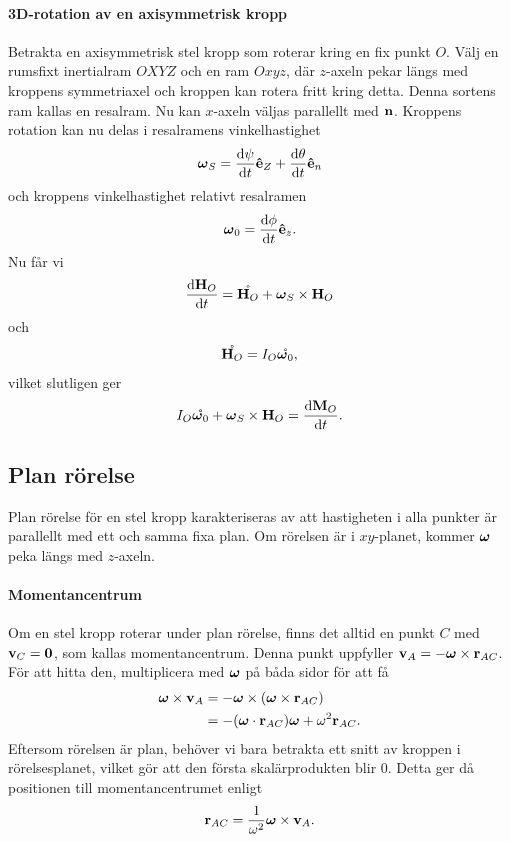 \paragraph{3D-rotation av en axisymmetrisk kropp}
Betrakta en axisymmetrisk stel kropp som roterar kring en fix punkt $O$. Välj en rumsfixt inertialram $OXYZ$ och en ram $Oxyz$, där $z$-axeln pekar längs med kroppens symmetriaxel och kroppen kan rotera fritt kring detta. Denna sortens ram kallas en resalram. Nu kan $x$-axeln väljas parallellt med $\vb{n}$. Kroppens rotation kan nu delas i resalramens vinkelhastighet
\begin{align*}
	\vb*{\omega}_{S} = \dv{\psi}{t}\vu{e}_{Z} + \dv{\theta}{t}\vu{e}_{n}
\end{align*}
och kroppens vinkelhastighet relativt resalramen
\begin{align*}
	\vb*{\omega}_{0} = \dv{\phi}{t}\vu{e}_{z}.
\end{align*}
Nu får vi
\begin{align*}
	\dv{\vb{H}_{O}}{t} = \mathring{\vb{H}_{O}} + \vb*{\omega}_{S}\times\vb{H}_{O}
\end{align*}
och
\begin{align*}
	\mathring{\vb{H}_{O}} = I_{O}\mathring{\vb*{\omega}_{0}},
\end{align*}
vilket slutligen ger
\begin{align*}
	I_{O}\mathring{\vb*{\omega}_{0}} + \vb*{\omega}_{S}\times\vb{H}_{O} = \dv{\vb{M}_{O}}{t}.
\end{align*}

\subsection{Plan rörelse}
Plan rörelse för en stel kropp karakteriseras av att hastigheten i alla punkter är parallellt med ett och samma fixa plan. Om rörelsen är i $xy$-planet, kommer $\vb*{\omega}$ peka längs med $z$-axeln.

\paragraph{Momentancentrum}
Om en stel kropp roterar under plan rörelse, finns det alltid en punkt $C$ med $\vb{v}_{C} = \vb{0}$, som kallas momentancentrum. Denna punkt uppfyller $\vb{v}_{A} = -\vb*{\omega}\times\vb{r}_{AC}$. För att hitta den, multiplicera med $\vb*{\omega}$ på båda sidor för att få
\begin{align*}
	\vb*{\omega}\times\vb{v}_{A} &= -\vb*{\omega}\times(\vb*{\omega}\times\vb{r}_{AC}) \\
	                             &= -(\vb*{\omega}\cdot\vb{r}_{AC})\vb*{\omega} + \omega^2\vb{r}_{AC}.
\end{align*}
Eftersom rörelsen är plan, behöver vi bara betrakta ett snitt av kroppen i rörelsesplanet, vilket gör att den första skalärprodukten blir $0$. Detta ger då positionen till momentancentrumet enligt
\begin{align*}
	\vb{r}_{AC} = \frac{1}{\omega^2}\vb*{\omega}\times\vb{v}_{A}.
\end{align*}

